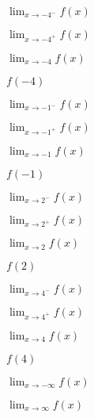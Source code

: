 \documentclass[11pt,letterpaper]{article}
\newenvironment{2enumerate}{%
	\begin{enumerate}[(a)]
	\begin{multicols}{2}
	}{%
	\end{multicols}
	\end{enumerate}
}
\newcommand{\ds}{\displaystyle}
\begin{document}
        \begin{2enumerate}
        \item $\ds\lim_{x \to -4^-} f(x)$
        \item $\ds\lim_{x \to -4^+} f(x)$
        \item $\ds\lim_{x \to -4} f(x)$
        \item $f(-4)$
        \item $\ds\lim_{x \to -1^-} f(x)$
        \item $\ds\lim_{x \to -1^+} f(x)$
        \item $\ds\lim_{x \to -1} f(x)$
        \item $f(-1)$
        \item $\ds\lim_{x \to 2^-} f(x)$
        \item $\ds\lim_{x \to 2^+} f(x)$
        \item $\ds\lim_{x \to 2} f(x)$
        \item $f(2)$
       \item $\ds\lim_{x \to 4^-} f(x)$
       \item $\ds\lim_{x \to 4^+} f(x)$
       \item $\ds\lim_{x \to 4} f(x)$
       \item $f(4)$
       \item $\ds\lim_{x \to -\infty} f(x)$
       \item $\ds\lim_{x \to \infty} f(x)$
        \end{2enumerate}
\end{document}
